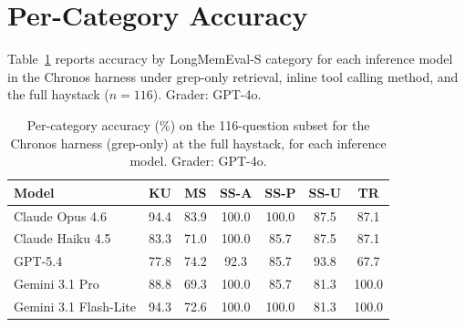 \documentclass[sigconf,nonacm]{acmart}
\begin{document}
\clearpage 
\appendix

\section{Per-Category Accuracy}
\label{app:per-category}

Table~\ref{tab:category} reports accuracy by LongMemEval-S category for each inference model in the Chronos harness under grep-only retrieval, inline tool calling method, and the full haystack ($n{=}116$). Grader: GPT-4o.

\begin{table}[t]
  \caption{Per-category accuracy (\%) on the 116-question subset for the Chronos harness (grep-only) at the full haystack, for each inference model. Grader: GPT-4o.}
  \label{tab:category}
  \centering
  \small
  \begin{tabular}{lcccccc}
    \toprule
    Model & KU & MS & SS-A & SS-P & SS-U & TR \\
    \midrule
    Claude Opus 4.6       & 94.4 & 83.9 & 100.0 & 100.0 & 87.5 & 87.1 \\
    Claude Haiku 4.5      & 83.3 & 71.0 & 100.0 & 85.7 & 87.5 & 87.1 \\
    GPT-5.4               & 77.8 & 74.2 & 92.3 & 85.7 & 93.8 & 67.7 \\
    Gemini 3.1 Pro        & 88.8 & 69.3 & 100.0 & 85.7 & 81.3 & 100.0 \\
    Gemini 3.1 Flash-Lite & 94.3 & 72.6 & 100.0 & 100.0 & 81.3 & 100.0 \\
    \bottomrule
  \end{tabular}
\end{table}
\end{document}
